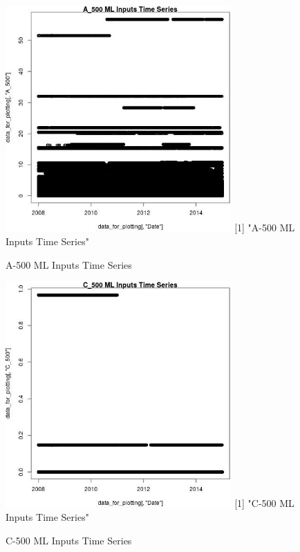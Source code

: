 \begin{figure} 
\centering  
\includegraphics[width=0.77\textwidth]{Code_Outputs/ML_input_report_ML_input_PM25_Step5_part_d_de_duplicated_aves_ML_input_A_500TS.jpg} 
[1] "A-500 ML Inputs Time Series"
\caption{\label{fig:ML_input_report_ML_input_PM25_Step5_part_d_de_duplicated_aves_ML_inputA_500TS}A-500 ML Inputs Time Series} 
\end{figure} 
 

\begin{figure} 
\centering  
\includegraphics[width=0.77\textwidth]{Code_Outputs/ML_input_report_ML_input_PM25_Step5_part_d_de_duplicated_aves_ML_input_C_500TS.jpg} 
[1] "C-500 ML Inputs Time Series"
\caption{\label{fig:ML_input_report_ML_input_PM25_Step5_part_d_de_duplicated_aves_ML_inputC_500TS}C-500 ML Inputs Time Series} 
\end{figure} 
 

